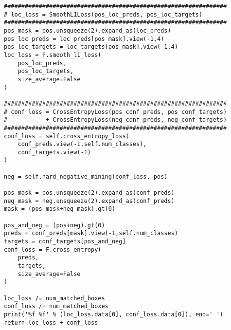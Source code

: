 \begin{lstlisting}[caption={损失函数}]
################################################################
# loc_loss = SmoothL1Loss(pos_loc_preds, pos_loc_targets)
################################################################
pos_mask = pos.unsqueeze(2).expand_as(loc_preds)    
pos_loc_preds = loc_preds[pos_mask].view(-1,4)     
pos_loc_targets = loc_targets[pos_mask].view(-1,4) 
loc_loss = F.smooth_l1_loss(
	pos_loc_preds,
	pos_loc_targets, 
	size_average=False
)

################################################################
# conf_loss = CrossEntropyLoss(pos_conf_preds, pos_conf_targets)
#           + CrossEntropyLoss(neg_conf_preds, neg_conf_targets)
################################################################
conf_loss = self.cross_entropy_loss(
	conf_preds.view(-1,self.num_classes), 
	conf_targets.view(-1)
)
	 
neg = self.hard_negative_mining(conf_loss, pos)   

pos_mask = pos.unsqueeze(2).expand_as(conf_preds)  
neg_mask = neg.unsqueeze(2).expand_as(conf_preds)  
mask = (pos_mask+neg_mask).gt(0)

pos_and_neg = (pos+neg).gt(0)
preds = conf_preds[mask].view(-1,self.num_classes)  
targets = conf_targets[pos_and_neg]              
conf_loss = F.cross_entropy(
	preds, 
	targets, 
	size_average=False
)

loc_loss /= num_matched_boxes
conf_loss /= num_matched_boxes
print('%f %f' % (loc_loss.data[0], conf_loss.data[0]), end=' ')
return loc_loss + conf_loss
\end{lstlisting}